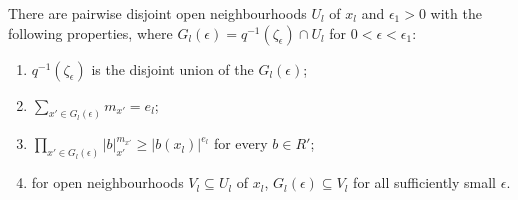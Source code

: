 \begin{lemma}\label{lem:nf-pieces}
\leanok
{}
There are pairwise disjoint open neighbourhoods $U_l$ of $x_l$ and $\epsilon_1>0$ with the following properties, where
$G_l(\epsilon)=q^{-1}(\zeta_\epsilon)\cap U_l$ for $0<\epsilon<\epsilon_1$:
\begin{enumerate}
\item $q^{-1}(\zeta_\epsilon)$ is the disjoint union of the $G_l(\epsilon)$;
\item $\sum_{x'\in G_l(\epsilon)}m_{x'}=e_l$;
\item $\prod_{x'\in G_l(\epsilon)}|b|_{x'}^{m_{x'}}\ge|b(x_l)|^{e_l}$ for every $b\in R'$;
\item for open neighbourhoods $V_l\subseteq U_l$ of $x_l$, $G_l(\epsilon)\subseteq V_l$ for all sufficiently small
$\epsilon$.
\end{enumerate}
\end{lemma}

